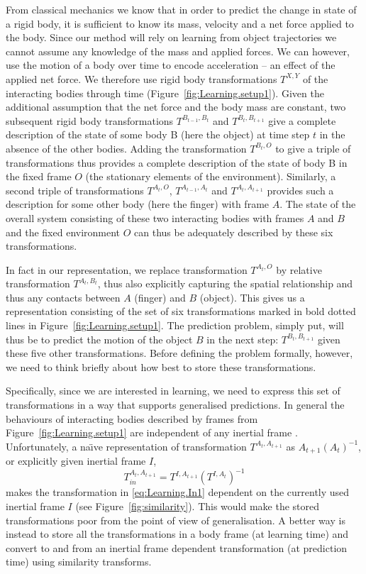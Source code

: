 From classical mechanics we know that in order to predict the change
in state of a rigid body, it is sufficient to know its mass, velocity
and a net force applied to the body.  Since our method will rely on
learning from object trajectories we cannot assume any knowledge of
the mass and applied forces. We can however, use the motion of a body over time to encode acceleration -- an effect of the applied net
force. We therefore use rigid body transformations $T^{X,Y}$ of the interacting bodies through time (Figure~\ref{fig:Learning.setup1}). Given the additional assumption that the net force and the body mass are constant, two subsequent rigid body transformations $T^{B_{t-1},
  B_{t}}$ and $T^{B_{t},B_{t+1}}$ give a complete description of the
state of some body B (here the object) at time step $t$ in the absence
of the other bodies.  Adding the transformation $T^{B_t, O}$ to give a
triple of transformations thus provides a complete description of the
state of body B in the fixed frame $O$ (the stationary elements of the
environment).  Similarly, a second triple of transformations $T^{A_t,
  O}$, $T^{A_{t-1}, A_{t}}$ and $T^{A_{t}, A_{t+1}}$ provides such a
description for some other body (here the finger) with frame $A$. 
The state of the overall system consisting of these two interacting
bodies with frames $A$ and $B$ and the fixed environment $O$ can
thus be adequately described by these six transformations.

In fact in our representation, we replace transformation $T^{A_t, O}$ by relative transformation $T^{A_t, B_t}$, thus also explicitly capturing the spatial relationship and thus any contacts between $A$ (finger) and $B$ (object). This gives us a representation consisting of the set of six transformations marked in bold dotted lines in Figure~\ref{fig:Learning.setup1}. The prediction problem, simply put, will thus be to predict the motion of the object $B$ in the next step: $T^{B_t,B_{t+1}}$ given these five other transformations. Before defining the problem formally, however, we need to think briefly about how best to store these transformations.

Specifically, since we are interested in learning, we need to express this set of transformations in a way that supports generalised predictions. In general the behaviours of interacting bodies described by frames from Figure~\ref{fig:Learning.setup1} are independent of any inertial frame \cite{kopicki_prediction_2010}. Unfortunately, a na\"{\i}ve representation of transformation $T^{A_{t}, A_{t+1}}$ as $A_{t+1}(A_{t})^{-1}$, or explicitly given inertial frame $I$,
\begin{equation}
T_{in}^{A_{t}, A_{t+1}} = T^{I, A_{t+1}} (T^{I, A_{t}})^{-1}
\label{eq:Learning.In1}
\end{equation}
\noindent makes the transformation in \eqref{eq:Learning.In1} dependent on the currently used inertial frame $I$ (see
Figure~\ref{fig:similarity}).  This would make the stored transformations poor from the point of view of generalisation. A better way is instead to store all the transformations in a body frame (at learning time) and convert to and from an inertial frame dependent transformation (at prediction time) using similarity transforms.

